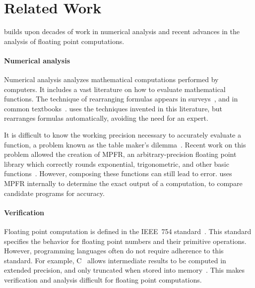 \documentclass[paper.tex]{subfiles}
\begin{document}
\section{Related Work}
\label{sec:relatedwork}

\casio builds upon decades of work in numerical analysis
  and recent advances in the analysis
  of floating point computations.

\paragraph{Numerical analysis}

Numerical analysis analyzes mathematical computations
  performed by computers.
It includes a vast literature on how to evaluate mathematical functions.
The technique of rearranging formulas
  appears in surveys~\cite{acm91-every-scientist,berkeley00-needle-like},
  and in common textbooks~\cite{book87-nmse}.
\casio uses the techniques invented in this literature,
  but rearranges formulas automatically, avoiding the need for an expert.

It is difficult to know the working precision necessary
  to accurately evaluate a function,
  a problem known as the table maker's dilemma~\cite{ensl03-table-maker}.
Recent work on this problem allowed the creation of MPFR,
  an arbitrary-precision floating point library
  which correctly rounds exponential, trigonometric, and other basic functions~\cite{acm07-mpfr}.
However, composing these functions can still lead to error.
\casio uses MPFR internally to determine
  the exact output of a computation,
  to compare candidate programs for accuracy.

\paragraph{Verification}

Floating point computation is defined in the IEEE~754
  standard~\cite{ieee85-standard,ieee08-standard}.
This standard specifies the behavior
  for floating point numbers and their primitive operations.
However, programming languages often
  do not require adherence to this standard.
For example, C~\cite{c99} allows intermediate results
  to be computed in extended precision,
  and only truncated when stored into memory~\cite{toplas08-pitfalls-verifying}.
This makes verification and analysis difficult
  for floating point computations.
\end{document}
